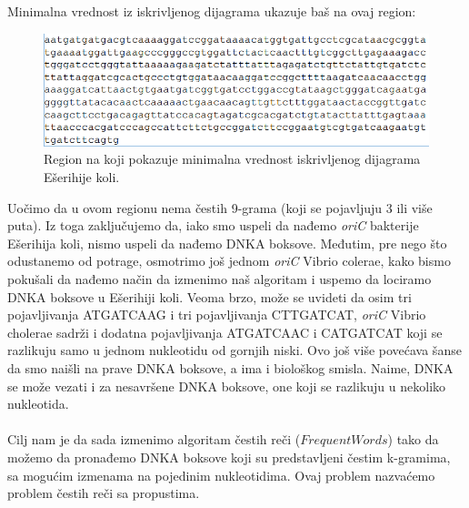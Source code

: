 Minimalna vrednost iz iskrivljenog dijagrama ukazuje baš na ovaj region:

\begin{figure}[H]
\centering
\includegraphics[width=1\textwidth]{poglavlja/1/slike/ecoli_region.png}
\caption{Region na koji pokazuje minimalna vrednost iskrivljenog dijagrama Ešerihije koli.}
\end{figure} 

Uočimo da u ovom regionu nema čestih 9-grama (koji se pojavljuju 3 ili više puta). Iz toga zaključujemo da, iako smo uspeli da nađemo \textit{oriC} bakterije Ešerihija koli, nismo uspeli da nađemo DNKA boksove. Međutim, pre nego što odustanemo od potrage, osmotrimo još jednom \textit{oriC} Vibrio colerae, kako bismo pokušali da nađemo način da izmenimo naš algoritam i uspemo da lociramo DNKA boksove u Ešerihiji koli. Veoma brzo, može se uvideti da osim tri pojavljivanja ATGATCAAG i tri pojavljivanja CTTGATCAT, \textit{oriC} Vibrio cholerae sadrži i dodatna pojavljivanja ATGATCAAC i CATGATCAT koji se razlikuju samo u jednom nukleotidu od gornjih niski. Ovo još više povećava šanse da smo naišli na prave DNKA boksove, a ima i biološkog smisla. Naime, DNKA se može vezati i za nesavršene DNKA boksove, one koji se razlikuju u nekoliko nukleotida.\\\\

Cilj nam je da sada izmenimo algoritam čestih reči ($FrequentWords$) tako da možemo da pronađemo DNKA boksove koji su predstavljeni čestim k-gramima, sa mogućim izmenama na pojedinim nukleotidima. Ovaj problem nazvaćemo problem čestih reči sa propustima.

